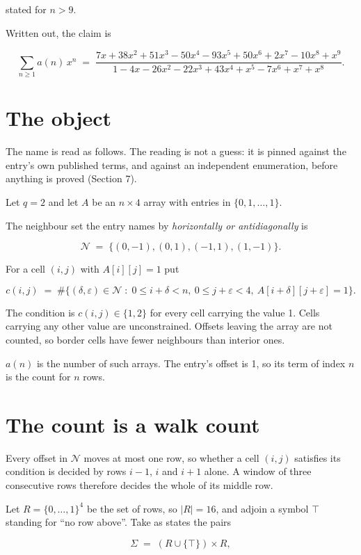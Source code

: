 \documentclass[11pt]{article}
\theoremstyle{definition}
\begin{document}
stated for $n > 9$.

Written out, the claim is

\[\sum_{n \ge 1} a(n)\,x^n \;=\; \frac{7x + 38x^{2} + 51x^{3} - 50x^{4} - 93x^{5} + 50x^{6} + 2x^{7} - 10x^{8} + x^{9}}{1 - 4x - 26x^{2} - 22x^{3} + 43x^{4} + x^{5} - 7x^{6} + x^{7} + x^{8}}.\]

\section{The object}

The name is read as follows. The reading is not a guess: it is pinned against the entry's own published terms, and against an independent enumeration, before anything is proved (Section 7).

Let $q = 2$ and let $A$ be an $n \times 4$ array with entries in $\{0,1,\dots,1\}$.

The neighbour set the entry names by {\itshape horizontally or antidiagonally} is

\[\mathcal{N} \;=\; \{(0,-1), (0,1), (-1,1), (1,-1)\}.\]

For a cell $(i,j)$ with $A[i][j] = 1$ put

\[c(i,j) \;=\; \#\bigl\{(\delta,\varepsilon)\in\mathcal{N} \;:\; 0\le i+\delta<n,\ 0\le j+\varepsilon<4,\ A[i+\delta][j+\varepsilon] = 1\bigr\}.\]

The condition is $c(i,j) \in \{1, 2\}$ for every cell carrying the value 1. Cells carrying any other value are unconstrained. Offsets leaving the array are not counted, so border cells have fewer neighbours than interior ones.

$a(n)$ is the number of such arrays. The entry's offset is 1, so its term of index $n$ is the count for $n$ rows.

\section{The count is a walk count}

Every offset in $\mathcal{N}$ moves at most one row, so whether a cell $(i,j)$ satisfies its condition is decided by rows $i-1$, $i$ and $i+1$ alone. A window of three consecutive rows therefore decides the whole of its middle row.

Let $R = \{0,\dots,1\}^{4}$ be the set of rows, so $|R| = 16$, and adjoin a symbol $\top$ standing for ``no row above''. Take as states the pairs

\[\Sigma \;=\; (R \cup \{\top\}) \times R,\]
\end{document}
